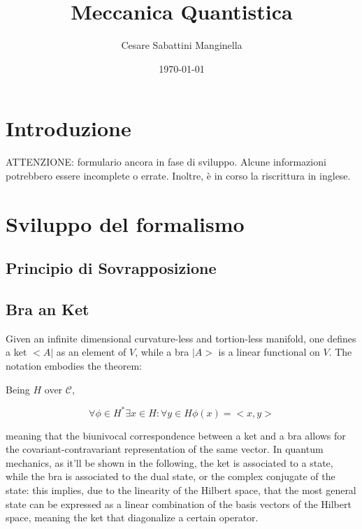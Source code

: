 \documentclass{article}
\title{Meccanica Quantistica}
\author{Cesare Sabattini Manginella}
\date{\today}
\begin{document}
\maketitle

\tableofcontents

\section{Introduzione}
ATTENZIONE: formulario ancora in fase di sviluppo. Alcune informazioni potrebbero essere incomplete o errate.
Inoltre, è in corso la riscrittura in inglese.

\section{Sviluppo del formalismo}

\subsection{Principio di Sovrapposizione}
\subsection{Bra an Ket}

Given an infinite dimensional curvature-less and tortion-less manifold, one defines a ket $<A|$ as an element of $V$, while a bra $|A>$ is a linear functional on $V$.
The notation embodies the theorem:

\begin{tcolorbox}[colframe=gray!50, colback=gray!10, coltitle=black, title=Fisher Reisz Representation Theorem]
    Being  $H$ over $\mathcal{C}$,

    \begin{equation}
        \forall \phi \in H^* \exists x \in H : \forall y \in H \phi(x)=<x,y>
    \end{equation}
\end{tcolorbox}

meaning that the biunivocal correspondence between a ket and a bra allows for the covariant-contravariant representation of the same vector.
In quantum mechanics, as it'll be shown in the following, the ket is associated to a state, while the bra is associated to the dual state, or the complex conjugate of the state:
this implies, due to the linearity of the Hilbert space, that the most general state can be expressed as a linear combination of the basis vectors of the Hilbert space, meaning
the ket that diagonalize a certain operator.
\end{document}

